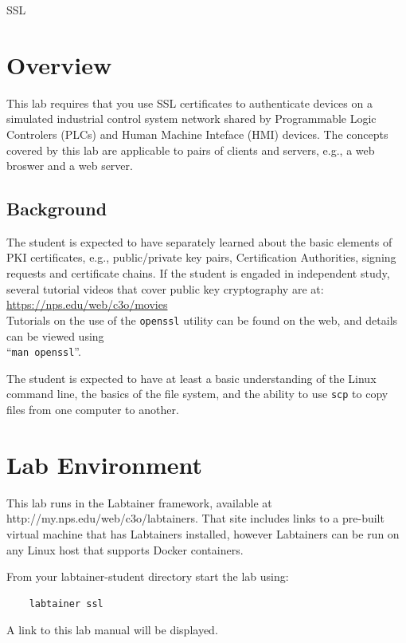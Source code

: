


\begin{center}
{\LARGE SSL}
\vspace{0.1in}\\
\end{center}

\copyrightnotice

\section{Overview}
This lab requires that you use SSL certificates to authenticate devices
on a simulated industrial control system network shared by 
Programmable Logic Controlers (PLCs) and Human Machine Inteface (HMI) devices.
The concepts covered by this lab are applicable to pairs of clients and servers,
e.g., a web broswer and a web server.

\subsection {Background}
The student is expected to have separately learned about the basic elements of PKI 
certificates, e.g., public/private key pairs, Certification Authorities, 
signing requests and certificate chains.  If the student is engaded in independent
study, several tutorial videos that cover public key cryptography are at:\\
\url{https://nps.edu/web/c3o/movies} \\
Tutorials on the use of the {\tt openssl} utility can be found on the web, and details
can be viewed using \\
``{\tt man openssl}''.

The student is expected to have at least a basic understanding of the Linux command line,
the basics of the file system, and the ability to use {\tt scp} to copy files from
one computer to another.

\section{Lab Environment}
This lab runs in the Labtainer framework,
available at http://my.nps.edu/web/c3o/labtainers.
That site includes links to a pre-built virtual machine
that has Labtainers installed, however Labtainers can
be run on any Linux host that supports Docker containers.

From your labtainer-student directory start the lab using:
\begin{verbatim}
    labtainer ssl
\end{verbatim}
\noindent A link to this lab manual will be displayed.  

